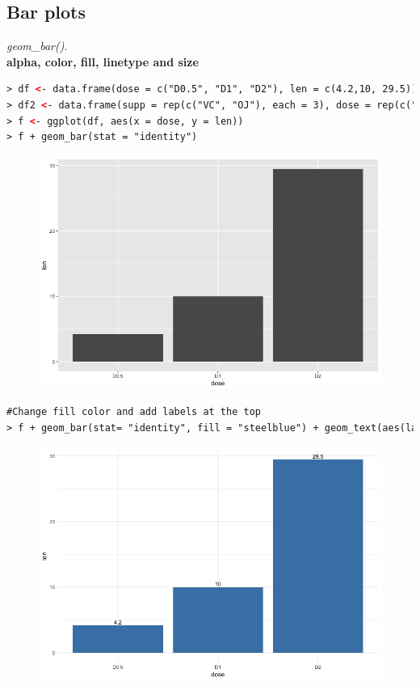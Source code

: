 \subsection{Bar plots}
\textit{geom\_bar()}.\newline
\\
\textbf{alpha, color, fill, linetype and size}
\begin{lstlisting}[language=html]
> df <- data.frame(dose = c("D0.5", "D1", "D2"), len = c(4.2,10, 29.5))
> df2 <- data.frame(supp = rep(c("VC", "OJ"), each = 3), dose = rep(c("D0.5", "D1", "D2"),2 ), len = c(6.8, 15, 33, 4.2, 10, 29.5))
> f <- ggplot(df, aes(x = dose, y = len))
> f + geom_bar(stat = "identity")
\end{lstlisting}
\begin{figure}[H]\begin{center}\includegraphics[scale=1 ]{ilu/bg130.png}\end{center}\end{figure}
\begin{lstlisting}[language=html]
#Change fill color and add labels at the top
> f + geom_bar(stat= "identity", fill = "steelblue") + geom_text(aes(label = len), vjust = -0.3, size = 3.5) + theme_minimal()
\end{lstlisting}
\begin{figure}[H]\begin{center}\includegraphics[scale=1 ]{ilu/bg131.png}\end{center}\end{figure}
